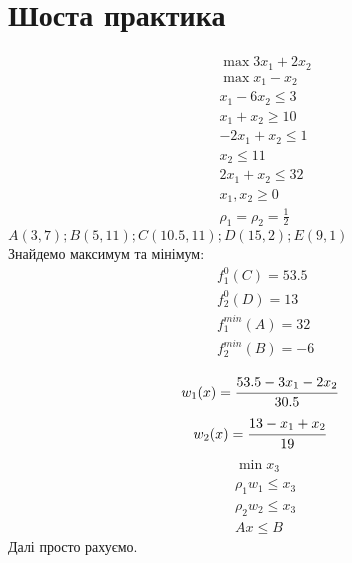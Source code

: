 \section{Шоста практика}
\begin{tsk}
\begin{eqnarray}
&\max 3x_1+2x_2\\
&\max x_1-x_2\\
&x_1 - 6x_2 \leq 3\\
&x_1+x_2 \geq 10\\
&-2x_1+x_2\leq 1\\
&x_2\leq 11\\
&2x_1+x_2\leq 32\\
&x_1,x_2\geq 0\\
&\rho_1=\rho_2=\frac12
\end{eqnarray}
$A(3,7);B(5,11);C(10.5,11);D(15,2);E(9,1)$\\
Знайдемо максимум та мінімум:\\
\begin{eqnarray}
&f_1^0(C) = 53.5\\
&f_2^0(D) = 13\\
&f_1^{min}(A) = 32\\
&f_2^{min}(B) = -6\\
\end{eqnarray}
\begin{equation}
w_1(x) = \cfrac{53.5-3x_1-2x_2}{30.5}
\end{equation}
\begin{equation}
w_2(x) = \cfrac{13-x_1+x_2}{19}
\end{equation}
\begin{eqnarray}
&\min x_3\\
&\rho_1w_1 \leq x_3\\
&\rho_2w_2 \leq x_3\\
&Ax \leq B
\end{eqnarray}
Далі просто рахуємо.
\end{tsk} 
